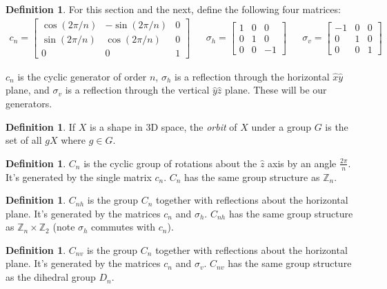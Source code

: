 \documentclass[12pt, letterpaper]{article}
\theoremstyle{definition} %
\newtheorem{defn}[thm]{Definition} %
\begin{document}
\begin{defn}
  For this section and the next, define the following four matrices:
  \begin{align*}
    c_n=
  \begin{bmatrix}
    \cos(2\pi/n) & -\sin(2\pi/n) & 0 \\ \sin(2\pi/n) & \cos(2\pi/n) & 0 \\ 0 & 0 & 1
  \end{bmatrix}
  & & \sigma_h=
  \begin{bmatrix}
    1 & 0 & 0 \\ 0 & 1 & 0 \\ 0 & 0 & -1
  \end{bmatrix}
  & & \sigma_v=
  \begin{bmatrix}
    -1 & 0 & 0 \\ 0 & 1 & 0 \\ 0 & 0 & 1
  \end{bmatrix}
  \end{align*}

  $c_n$ is the cyclic generator of order $n$, $\sigma_h$ is a reflection through the horizontal $\hat{x}\hat{y}$ plane, and 
  $\sigma_v$ is a reflection through the vertical $\hat{y}\hat{z}$ plane. These will be our generators.
\end{defn}
\begin{defn}
  If $X$ is a shape in 3D space, the \emph{orbit} of $X$ under a group $G$ is the set of all $gX$ where $g\in G$.
\end{defn}
\begin{defn}
  $C_n$ is the cyclic group of rotations about the $\hat{z}$ axis by an angle $\frac{2\pi}{n}$. It's generated by the single matrix $c_n$. 
  $C_{n}$ has the same group structure as $\mathbb{Z}_n$.
\end{defn}

\begin{defn}
  $C_{nh}$ is the group $C_n$ together with reflections about the horizontal plane. It's generated by the matrices $c_n$ and $\sigma_h$. 
  $C_{nh}$ has the same group structure as $\mathbb{Z}_n\times \mathbb{Z}_2$ (note $\sigma_h$ commutes with $c_n$).
\end{defn}

\begin{defn}
  $C_{nv}$ is the group $C_n$ together with reflections about the horizontal plane. It's generated by the matrices $c_n$ and $\sigma_v$. 
  $C_{nv}$ has the same group structure as the dihedral group $D_n$.
\end{defn}
\end{document}
